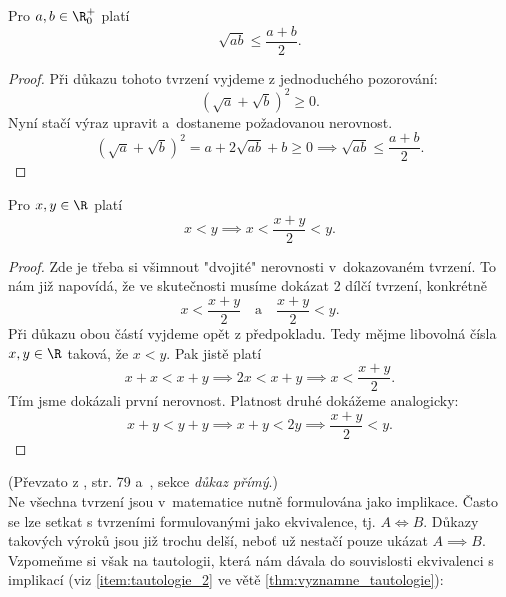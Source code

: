 \begin{proposition}[AG nerovnost]
    Pro $a,b\in\R_0^+$ platí
    \begin{equation*}
        \sqrt{ab}\leq\dfrac{a+b}{2}.
    \end{equation*}
\end{proposition}
\begin{proof}
    Při důkazu tohoto tvrzení vyjdeme z jednoduchého pozorování:
    \begin{equation*}
        (\sqrt{a}+\sqrt{b})^2\geq 0.
    \end{equation*}
    Nyní stačí výraz upravit a~dostaneme požadovanou nerovnost.
    \begin{equation*}
        (\sqrt{a}+\sqrt{b})^2 = a+2\sqrt{ab}+b\geq 0 \implies \sqrt{ab}\leq \dfrac{a+b}{2}.
    \end{equation*}
\end{proof}
\begin{proposition}
    Pro $x,y\in\R$ platí
    \begin{equation*}
        x<y \implies x<\dfrac{x+y}{2}<y.
    \end{equation*}
\end{proposition}
\begin{proof}
    Zde je třeba si všimnout "dvojité" nerovnosti v~dokazovaném tvrzení. To nám již napovídá, že ve skutečnosti musíme dokázat 2 dílčí tvrzení, konkrétně
    \begin{equation*}
        x < \dfrac{x+y}{2}\quad\text{a}\quad\dfrac{x+y}{2} < y.
    \end{equation*}
    Při důkazu obou částí vyjdeme opět z předpokladu. Tedy mějme libovolná čísla $x,y\in\R$ taková, že $x<y$. Pak jistě platí
    \begin{equation*}
        x+x<x+y \implies 2x<x+y \implies x<\dfrac{x+y}{2}.
    \end{equation*}
    Tím jsme dokázali první nerovnost. Platnost druhé dokážeme analogicky:
    \begin{equation*}
        x+y<y+y \implies x+y<2y \implies \dfrac{x+y}{2}<y.
    \end{equation*}
\end{proof}
(Převzato z \cite{ChartrandPolimeniZhang2014}, str. 79 a~\cite{MatematickaLogikaUK2010}, sekce \emph{důkaz přímý}.)\\
Ne všechna tvrzení jsou v~matematice nutně formulována jako implikace. Často se lze setkat s tvrzeními formulovanými jako ekvivalence, tj. $A \iff B$. Důkazy takových výroků jsou již trochu delší, neboť už nestačí pouze ukázat $A \implies B$. Vzpomeňme si však na tautologii, která nám dávala do souvislosti ekvivalenci s implikací (viz \ref{item:tautologie_2} ve větě \ref{thm:vyznamne_tautologie}):
